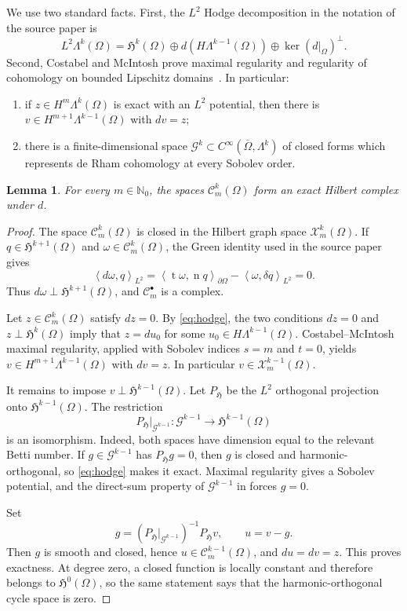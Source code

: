 \documentclass[11pt]{article}
\newtheorem{lemma}{Lemma}
\newcommand{\HH}{\mathfrak H}
\newcommand{\cC}{\mathcal C}
\newcommand{\cX}{\mathcal X}
\newcommand{\cG}{\mathcal G}
\newcommand{\ip}[2]{\left\langle #1,#2\right\rangle}
\begin{document}
We use two standard facts.  First, the $L^2$ Hodge decomposition in the
notation of the source paper is
\begin{equation}\label{eq:hodge}
 L^2\Lambda^k(\Omega)
 =\HH^k(\Omega)\oplus d(H\Lambda^{k-1}(\Omega))
  \oplus\ker(d|_\Omega)^\perp.
\end{equation}
Second, Costabel and McIntosh prove maximal regularity and regularity of
cohomology on bounded Lipschitz domains~\cite[Corollary 4.7 and
Theorem 4.9]{CostabelMcIntosh}.  In particular:
\begin{enumerate}
\item if $z\in H^m\Lambda^k(\Omega)$ is exact with an $L^2$ potential, then
there is $v\in H^{m+1}\Lambda^{k-1}(\Omega)$ with $dv=z$;
\item there is a finite-dimensional space
$\cG^k\subset C^\infty(\overline\Omega,\Lambda^k)$ of closed forms which
represents de Rham cohomology at every Sobolev order.
\end{enumerate}

\begin{lemma}\label{lem:exact}
For every $m\in\mathbb N_0$, the spaces $\cC_m^k(\Omega)$ form an exact
Hilbert complex under $d$.
\end{lemma}

\begin{proof}
The space $\cC_m^k(\Omega)$ is closed in the Hilbert graph space
$\cX_m^k(\Omega)$.  If $q\in\HH^{k+1}(\Omega)$ and
$\omega\in\cC_m^k(\Omega)$, the Green identity used in the source paper
gives
\[
 \ip{d\omega}{q}_{L^2}
 =\ip{\operatorname t\omega}{\operatorname n q}_{\partial\Omega}
   -\ip{\omega}{\delta q}_{L^2}=0.
\]
Thus $d\omega\perp\HH^{k+1}(\Omega)$, and $\cC_m^\bullet$ is a complex.

Let $z\in\cC_m^k(\Omega)$ satisfy $dz=0$.  By
\eqref{eq:hodge}, the two conditions $dz=0$ and
$z\perp\HH^k(\Omega)$ imply that $z=du_0$ for some
$u_0\in H\Lambda^{k-1}(\Omega)$.  Costabel--McIntosh maximal regularity,
applied with Sobolev indices $s=m$ and $t=0$, yields
$v\in H^{m+1}\Lambda^{k-1}(\Omega)$ with $dv=z$.  In particular
$v\in\cX_m^{k-1}(\Omega)$.

It remains to impose $v\perp\HH^{k-1}(\Omega)$.  Let $P_{\HH}$ be the
$L^2$ orthogonal projection onto $\HH^{k-1}(\Omega)$.  The restriction
\[
                   P_{\HH}|_{\cG^{k-1}}:
                   \cG^{k-1}\longrightarrow\HH^{k-1}(\Omega)
\]
is an isomorphism.  Indeed, both spaces have dimension equal to the relevant
Betti number.  If $g\in\cG^{k-1}$ has $P_{\HH}g=0$, then $g$ is closed and
harmonic-orthogonal, so \eqref{eq:hodge} makes it exact.  Maximal regularity
gives a Sobolev potential, and the direct-sum property of $\cG^{k-1}$ in
\cite[Theorem 4.9]{CostabelMcIntosh} forces $g=0$.

Set
\[
 g=(P_{\HH}|_{\cG^{k-1}})^{-1}P_{\HH}v,
 \qquad u=v-g.
\]
Then $g$ is smooth and closed, hence $u\in\cC_m^{k-1}(\Omega)$, and
$du=dv=z$.  This proves exactness.  At degree zero, a closed function is
locally constant and therefore belongs to $\HH^0(\Omega)$, so the same
statement says that the harmonic-orthogonal cycle space is zero.
\end{proof}
\end{document}
